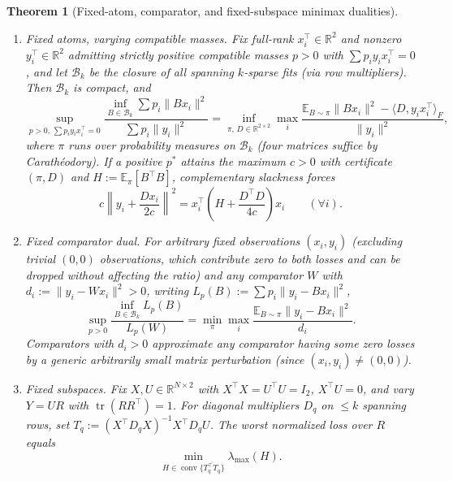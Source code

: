 \documentclass[11pt]{article}
\theoremstyle{plain}
\newtheorem{theorem}{Theorem}
\theoremstyle{definition}
\theoremstyle{remark}
\DeclareMathOperator{\tr}{tr}
\DeclareMathOperator{\conv}{conv}
\begin{document}
\begin{theorem}[Fixed-atom, comparator, and fixed-subspace minimax dualities]\label{thm:minimax}
\leavevmode
\begin{enumerate}[label=\textup{(\arabic*)}]
\item \emph{Fixed atoms, varying compatible masses.} Fix full-rank $x_i^\top \in \mathbb{R}^2$ and nonzero $y_i^\top \in \mathbb{R}^2$ admitting strictly positive compatible masses $p > 0$ with $\sum p_i y_i x_i^\top = 0$, and let $\mathcal{B}_k$ be the closure of all spanning $k$-sparse fits (via row multipliers). Then $\mathcal{B}_k$ is compact, and
\begin{equation}\label{eq:minimax}
\sup_{p > 0,\, \sum p_i y_i x_i^\top = 0} \frac{\inf_{B \in \mathcal{B}_k} \sum p_i \|Bx_i\|^2}{\sum p_i \|y_i\|^2}
= \inf_{\pi,\, D \in \mathbb{R}^{2\times 2}} \max_i \frac{\mathbb{E}_{B \sim \pi}\|Bx_i\|^2 - \langle D, y_i x_i^\top\rangle_F}{\|y_i\|^2},
\end{equation}
where $\pi$ runs over probability measures on $\mathcal{B}_k$ (four matrices suffice by Carath\'eodory). If a positive $p^*$ attains the maximum $c > 0$ with certificate $(\pi, D)$ and $H := \mathbb{E}_\pi[B^\top B]$, complementary slackness forces
\[
c\left\|y_i + \frac{Dx_i}{2c}\right\|^2 = x_i^\top\left(H + \frac{D^\top D}{4c}\right)x_i \qquad (\forall i).
\]
\item \emph{Fixed comparator dual.} For arbitrary fixed observations $(x_i, y_i)$ (excluding trivial $(0,0)$ observations, which contribute zero to both losses and can be dropped without affecting the ratio) and any comparator $W$ with $d_i := \|y_i - Wx_i\|^2 > 0$, writing $L_p(B) := \sum p_i \|y_i - Bx_i\|^2$,
\[
\sup_{p > 0} \frac{\inf_{B \in \mathcal{B}_k} L_p(B)}{L_p(W)}
= \min_\pi \max_i \frac{\mathbb{E}_{B \sim \pi}\|y_i - Bx_i\|^2}{d_i}.
\]
Comparators with $d_i > 0$ approximate any comparator having some zero losses by a generic arbitrarily small matrix perturbation (since $(x_i, y_i) \neq (0,0)$).
\item \emph{Fixed subspaces.} Fix $X, U \in \mathbb{R}^{N \times 2}$ with $X^\top X = U^\top U = I_2$, $X^\top U = 0$, and vary $Y = UR$ with $\tr(RR^\top) = 1$. For diagonal multipliers $D_q$ on $\le k$ spanning rows, set $T_q := (X^\top D_q X)^{-1}X^\top D_q U$. The worst normalized loss over $R$ equals
\[
\min_{H \in \conv \overline{\{T_q^\top T_q\}}} \lambda_{\max}(H).
\]
\end{enumerate}
\end{theorem}
\end{document}
